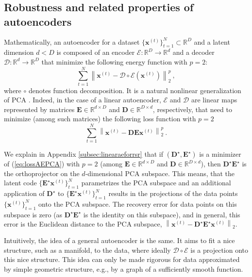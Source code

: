 \documentclass{article} \usepackage{iclr2020_conference,times}
\def\eqref#1{(\ref{#1})}
\def\rvx{{\mathbf{x}}}
\def\rmD{{\mathbf{D}}}
\def\rmE{{\mathbf{E}}}
\newcommand{\R}{\mathbb{R}}
\newcommand{\norm}[1]{\left\lVert#1\right\rVert}
\begin{document}
\subsection{Robustness and related properties of autoencoders} 
\label{sec:heuristic}
Mathematically, an autoencoder for a dataset $\{\rvx^{(t)}\}_{t=1}^N \subset \R^D$ and a latent dimension $d <D$ is composed of an encoder $\mathscr{E}: \R^D \rightarrow \R^d$ and a decoder $\mathscr{D}: \R^d \rightarrow \R^D$ that minimize the following energy function with $p=2$:
\begin{equation}\label{eq:lossAE}
\sum_{t=1}^N \norm{\rvx^{(t)} - \mathscr{D} \circ \mathscr{E} ({\rvx}^{(t)})}_2^p ~,
\end{equation}
where $\circ$ denotes function decomposition.
It is a natural nonlinear generalization of PCA \citep{goodfellow2016deep}. Indeed, in the case of a linear autoencoder, $\mathscr{E}$ and $\mathscr{D}$ are linear maps represented by  matrices  $\rmE \in \R^{d \times D}$ and $\rmD \in \R^{D \times d}$, respectively, that need to minimize (among such matrices) the following loss function with $p=2$ 
\begin{equation}\label{eq:lossAEPCA}
\sum_{t=1}^N \norm{\rvx^{(t)} - \rmD \rmE {\rvx}^{(t)}}_2^p ~.
\end{equation}


We explain in Appendix \ref{subsec:linearaeforrsr} that if  $(\rmD^{\star},\rmE^{\star})$ is a minimizer of \eqref{eq:lossAEPCA} with $p=2$ (among  $\rmE \in \R^{d \times D}$ and $\rmD \in \R^{D \times d}$), then $\rmD^{\star} \rmE^{\star}$ is the orthoprojector on the $d$-dimensional PCA subspace. This means, that the latent code
$\{\rmE^{\star} \rvx^{(t)}\}_{t=1}^N$ parametrizes the PCA subspace and an additional application of
$\rmD^{\star}$ to $\{\rmE^{\star} \rvx^{(t)}\}_{t=1}^N$ results in the projections of the data points $\{\rvx^{(t)}\}_{t=1}^N$ onto the PCA subspace. The recovery error for data points on this subspace is zero (as $\rmD^{\star} \rmE^{\star}$ is the identity on this subspace), and in general, this error is the Euclidean distance to the PCA subspace, $\norm{\rvx^{(t)} - \rmD^{\star} \rmE^{\star} {\rvx}^{(t)}}_2$.




Intuitively, the idea of a general autoencoder is the same. It aims to fit a nice structure, such as a  manifold,  to the data, where ideally $\mathscr{D} \circ \mathscr{E}$ is a projection onto this nice structure. This idea can only be made rigorous for data approximated by simple geometric structure, e.g., by a graph of a sufficiently smooth function.
\end{document}
